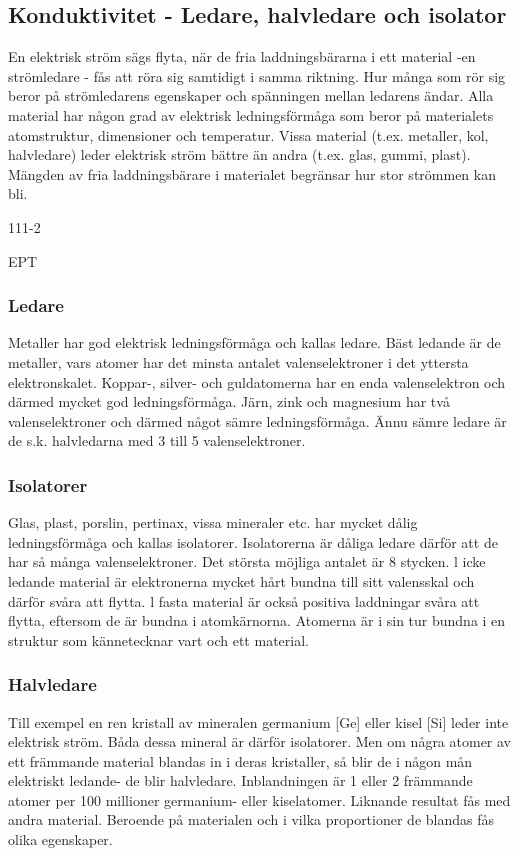 \documentclass[a4paper,twoside,twocolumn,openright]{book}
\begin{document}
\subsection{Konduktivitet - Ledare, halvledare och isolator}

En elektrisk ström sägs flyta, när de fria
laddningsbärarna i ett material -en strömledare - fås att röra sig samtidigt i samma
riktning. Hur många som rör sig beror på
strömledarens egenskaper och spänningen
mellan ledarens ändar.
Alla material har någon grad av elektrisk
ledningsförmåga som beror på materialets
atomstruktur, dimensioner och temperatur.
Vissa material (t.ex. metaller, kol, halvledare) leder elektrisk ström bättre än andra
(t.ex. glas, gummi, plast). Mängden av fria
laddningsbärare i materialet begränsar hur
stor strömmen kan bli.

111-2

EPT
\subsubsection{Ledare}
Metaller har god elektrisk ledningsförmåga
och kallas ledare. Bäst ledande är de metaller, vars atomer har det minsta antalet valenselektroner i det yttersta elektronskalet. Koppar-, silver- och guldatomerna har en enda
valenselektron och därmed mycket god ledningsförmåga. Järn, zink och magnesium
har två valenselektroner och därmed något
sämre ledningsförmåga. Ännu sämre ledare
är de s.k. halvledarna med 3 till 5 valenselektroner.

\subsubsection{Isolatorer}
Glas, plast, porslin, pertinax, vissa mineraler
etc. har mycket dålig ledningsförmåga och
kallas isolatorer. Isolatorerna är dåliga ledare därför att de har så många valenselektroner. Det största möjliga antalet är 8
stycken.
l icke ledande material är elektronerna
mycket hårt bundna till sitt valensskal och
därför svåra att flytta. l fasta material är
också positiva laddningar svåra att flytta,
eftersom de är bundna i atomkärnorna. Atomerna är i sin tur bundna i en struktur som
kännetecknar vart och ett material.

\subsubsection{Halvledare}
Till exempel en ren kristall av mineralen
germanium [Ge] eller kisel [Si] leder inte
elektrisk ström. Båda dessa mineral är därför isolatorer. Men om några atomer av ett
främmande material blandas in i deras kristaller, så blir de i någon mån elektriskt ledande- de blir halvledare. Inblandningen är
1 eller 2 främmande atomer per 100 millioner
germanium- eller kiselatomer. Liknande resultat fås med andra material. Beroende på
materialen och i vilka proportioner de blandas fås olika egenskaper.
\end{document}
